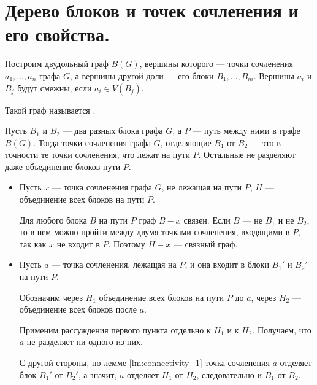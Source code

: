 \section{Дерево блоков и точек сочленения и его свойства.}
\begin{definition}
    Построим двудольный граф $B(G)$, вершины которого --- точки сочленения $a_1, \ldots , a_n$ графа $G$, а вершины другой доли --- его блоки $B_1, \ldots, B_m$. Вершины $a_i$ и $B_j$ будут смежны, если $a_i \in V(B_j)$.

	Такой граф называется .
\end{definition}

\begin{lemma}\label{lm:connectivity_2}
	Пусть $B_1$ и $B_2$ --- два разных блока графа $G$, а $P$ --- путь между ними в графе $B(G)$. Тогда точки сочленения графа $G$, отделяющие $B_1$ от $B_2$ --- это в точности те точки сочленения, что лежат на пути $P$. Остальные не разделяют даже объединение блоков пути $P$. 
\end{lemma}
\begin{itemize}
	\item
    Пусть $x$ ---  точка сочленения графа $G$, не лежащая на пути $P$, $H$ --- объединение всех блоков на пути $P$.

	Для любого блока $B$ на пути $P$ граф $B-x$ связен. Если $B$ --- не $B_1$ и не $B_2$, то в нем можно пройти между двумя точками сочленения, входящими в $P$, так как $x$ не входит в $P$. Поэтому $H-x$ --- связный граф.
\item

	Пусть $a$ ---  точка сочленения, лежащая на  $P$, и она входит в блоки $B_1'$ и $B_2'$ на пути $P$.

	Обозначим через $H_1$ объединение всех блоков на пути $P$ до $a$, через $H_2$ --- объединение всех блоков после $a$.

\begin{figure}[ht]
    \centering
    \caption{}
    \label{fig:block-tree}
\end{figure}

	Применим рассуждения первого пункта отдельно к $H_1$ и к $H_2$. Получаем, что $a$ не разделяет ни одного из них.

	С другой стороны, по лемме \ref{lm:connectivity_1} точка сочленения $a$ отделяет блок $B_1'$ от $B_2'$, а значит, $a$ отделяет $H_1$ от $H_2$, следовательно и $B_1$ от $B_2$.
\end{itemize}

